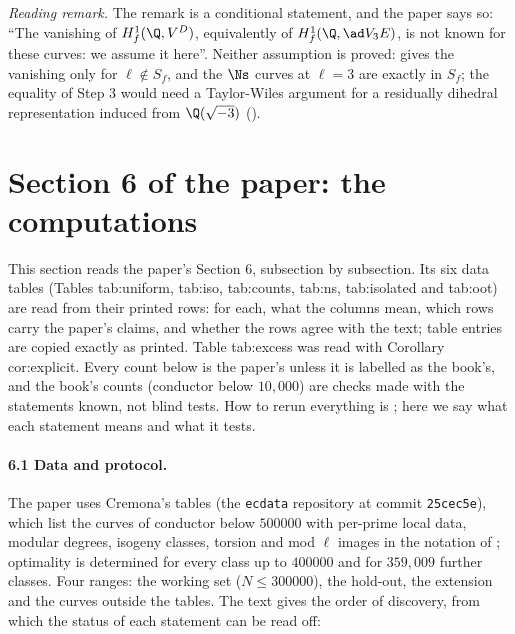 \begin{sloppypar}
\noindent\emph{Reading remark.} The remark is a conditional statement, and the paper says so: ``The vanishing of $H^1_f(\Q,V^D)$, equivalently of $H^1_f(\Q,\ad V_3E)$, is not known
for these curves: we assume it here''. Neither assumption is proved: \cite[Theorem 2.7]{DFG04} gives the vanishing only for $\ell\notin S_f$, and the $\Ns$ curves at $\ell=3$ are exactly in
$S_f$; the equality of Step 3 would need a Taylor-Wiles argument for a residually dihedral representation induced from $\Q(\sqrt{-3})$ ().

\section[Paper 6: the computations]{Section 6 of the paper: the computations}\label{sec:paper:data}

This section reads the paper's Section 6, subsection by subsection. Its six data tables (Tables tab:uniform, tab:iso, tab:counts, tab:ns, tab:isolated and
tab:oot) are read from their printed rows: for each, what the columns mean, which rows carry the paper's claims, and whether the rows agree with the text; table
entries are copied exactly as printed. Table tab:excess was read with Corollary cor:explicit. Every count below is the paper's unless it is labelled as the book's, and the book's counts (conductor below
$10{,}000$) are checks made with the statements known, not blind tests. How to rerun everything is ; here we say what each statement means and what it
tests.

\paragraph{6.1 Data and protocol.} The paper uses Cremona's tables \cite{Cremona97} (the \texttt{ecdata} repository at commit \texttt{25cec5e}), which list the curves of conductor
below $500000$ with per-prime local data, modular degrees, isogeny classes, torsion and mod $\ell$ images in the notation of \cite{Sutherland16}; optimality is determined for
every class up to $400000$ and for $359{,}009$ further classes. Four ranges: the working set ($N\le300000$), the hold-out, the extension and the curves outside the tables. The text
gives the order of discovery, from which the status of each statement can be read off:


\end{sloppypar}

